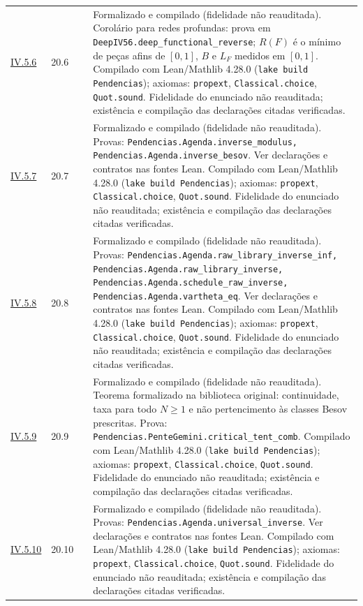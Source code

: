 \documentclass[12pt,a4paper]{article}
\theoremstyle{preciso}
\theoremstyle{definition}
\newcommand{\code}[1]{\nolinkurl{#1}}
\theoremstyle{preciso}
\theoremstyle{preciso}
\theoremstyle{preciso}
\theoremstyle{preciso}
\theoremstyle{definition}
\theoremstyle{preciso}
\theoremstyle{definition}
\theoremstyle{preciso}
\theoremstyle{preciso}
\theoremstyle{definition}
\begin{document}
\begin{singlespace}
\begin{longtable}{@{}p{.11\linewidth}p{.09\linewidth}p{.09\linewidth}p{.59\linewidth}@{}}
\hyperref[map:artigo_3:5.6]{IV.5.6} & 20.6 & \pageref{map:artigo_3:5.6} & Formalizado e compilado (fidelidade não reauditada). Corolário para redes profundas: prova em \code{DeepIV56.deep_functional_reverse}; $R(F)$ é o mínimo de peças afins de $[0,1]$, $B$ e $L_F$ medidos em $[0,1]$. Compilado com Lean/Mathlib 4.28.0 (\texttt{lake build Pendencias}); axiomas: \texttt{propext}, \texttt{Classical.choice}, \texttt{Quot.sound}. Fidelidade do enunciado não reauditada; existência e compilação das declarações citadas verificadas.\\[4pt]
\hyperref[map:artigo_3:5.7]{IV.5.7} & 20.7 & \pageref{map:artigo_3:5.7} & Formalizado e compilado (fidelidade não reauditada). Provas: \code{Pendencias.Agenda.inverse_modulus, Pendencias.Agenda.inverse_besov}. Ver declarações e contratos nas fontes Lean. Compilado com Lean/Mathlib 4.28.0 (\texttt{lake build Pendencias}); axiomas: \texttt{propext}, \texttt{Classical.choice}, \texttt{Quot.sound}. Fidelidade do enunciado não reauditada; existência e compilação das declarações citadas verificadas.\\[4pt]
\hyperref[map:artigo_3:5.8]{IV.5.8} & 20.8 & \pageref{map:artigo_3:5.8} & Formalizado e compilado (fidelidade não reauditada). Provas: \code{Pendencias.Agenda.raw_library_inverse_inf, Pendencias.Agenda.raw_library_inverse, Pendencias.Agenda.schedule_raw_inverse, Pendencias.Agenda.vartheta_eq}. Ver declarações e contratos nas fontes Lean. Compilado com Lean/Mathlib 4.28.0 (\texttt{lake build Pendencias}); axiomas: \texttt{propext}, \texttt{Classical.choice}, \texttt{Quot.sound}. Fidelidade do enunciado não reauditada; existência e compilação das declarações citadas verificadas.\\[4pt]
\hyperref[map:artigo_3:5.9]{IV.5.9} & 20.9 & \pageref{map:artigo_3:5.9} & Formalizado e compilado (fidelidade não reauditada). Teorema formalizado na biblioteca original: continuidade, taxa para todo $N\ge1$ e não pertencimento às classes Besov prescritas. Prova: \code{Pendencias.PenteGemini.critical_tent_comb}. Compilado com Lean/Mathlib 4.28.0 (\texttt{lake build Pendencias}); axiomas: \texttt{propext}, \texttt{Classical.choice}, \texttt{Quot.sound}. Fidelidade do enunciado não reauditada; existência e compilação das declarações citadas verificadas.\\[4pt]
\hyperref[map:artigo_3:5.10]{IV.5.10} & 20.10 & \pageref{map:artigo_3:5.10} & Formalizado e compilado (fidelidade não reauditada). Provas: \code{Pendencias.Agenda.universal_inverse}. Ver declarações e contratos nas fontes Lean. Compilado com Lean/Mathlib 4.28.0 (\texttt{lake build Pendencias}); axiomas: \texttt{propext}, \texttt{Classical.choice}, \texttt{Quot.sound}. Fidelidade do enunciado não reauditada; existência e compilação das declarações citadas verificadas.\\[4pt]

\end{longtable}
\end{singlespace}
\end{document}
